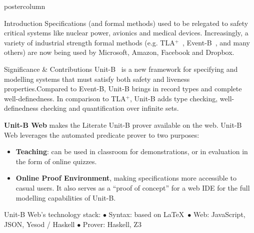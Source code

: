 \documentclass{beamer}
\newcommand{\tla}{TLA${}^+$}
\begin{document}
\begin{frame}
\begin{columns}
\begin{column}{.3\textwidth}
\begin{beamercolorbox}[center]{postercolumn}
\begin{minipage}{.98\textwidth}
{\begin{myblock}{Introduction}
            Specifications (and formal methods) used to be relegated to safety
            critical systems like nuclear power, avionics and medical devices.
            Increasingly, a variety of industrial strength formal methods (e.g.
            \tla~\cite{DBLP:books/aw/Lamport2002},
            Event-B~\cite{DBLP:books/daglib/0024570}, and many others) are now
            being used by Microsoft, Amazon, Facebook and Dropbox.
          \end{myblock}

          \begin{myblock}{Significance \& Contributions}
            {Unit-B}~\cite{SoSyM/Hudon/Hoang/Ostroff15} is a new framework for
            specifying and modelling systems that must satisfy both safety and
            liveness properties.Compared to Event-B, Unit-B brings in record
            types and complete well-definedness. In comparison to \tla, Unit-B
            adds type checking, well-definedness checking and quantification
            over infinite sets.
            \bigskip

            \textbf{Unit-B Web} makes the Literate Unit-B prover available on
            the web. Unit-B Web leverages the automated predicate prover to
            two purposes:

            \begin{itemize}
              \item \textbf{Teaching}: can be used in classroom for
                demonstrations, or in evaluation in the form of online quizzes.

              \item \textbf{Online Proof Environment}, making specifications
                more accessible to casual users. It also serves as a ``proof of
                concept'' for a web IDE for the full modelling capabilities of
                Unit-B.
            \end{itemize}
            \bigskip

            Unit-B Web's technology stack:
            $\bullet$ {Syntax:} based on \LaTeX\
            $\bullet$ {Web:} JavaScript, JSON, Yesod / Haskell
            $\bullet$ {Prover:} Haskell, Z3


\end{myblock}}
\end{minipage}
\end{beamercolorbox}
\end{column}
\end{columns}
\end{frame}
\end{document}
